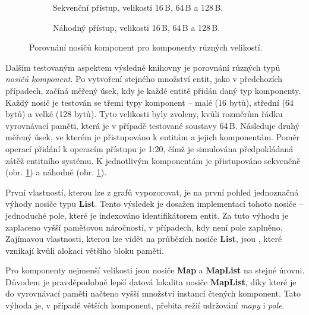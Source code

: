 \begin{figure}[H]
	\centering
	\begin{subfigure}[b]{\textwidth}
		\caption{Sekvenční přístup, velikosti 16\,B, 64\,B a 128\,B.}\label{Fig:EVALHoldersSeq}
	\end{subfigure}
	\begin{subfigure}[b]{\textwidth}
		\caption{Náhodný přístup, velikosti 16\,B, 64\,B a 128\,B.}\label{Fig:EVALHoldersRand}
	\end{subfigure}
	\caption{Porovnání nosičů komponent pro komponenty různých velikostí.}
\end{figure}

Dalším testovaným aspektem výsledné knihovny je porovnání různých typů \emph{nosičů komponent}. Po vytvoření stejného množství entit, jako v předchozích případech, začíná měřený úsek, kdy je každé entitě přidán daný typ komponenty. Každý nosič je testován se třemi typy komponent -- malé (16 bytů), střední (64 bytů) a velké (128 bytů). Tyto velikosti byly zvoleny, kvůli rozměrům řádku vyrovnávací paměti, která je v případě testované soustavy 64\,B. Následuje druhý měřený úsek, ve kterém je přistupováno k entitám a jejich komponentám. Poměr operací přidání k operacím přístupu je 1:20, čímž je simulována předpokládaná zátěž entitního systému. K jednotlivým komponentám je přistupováno sekvenčně (obr. \ref{Fig:EVALHoldersSeq}) a náhodně (obr. \ref{Fig:EVALHoldersSeq}).

První vlastností, kterou lze z grafů vypozorovat, je na první pohled jednoznačná výhody nosiče typu \textbf{List}. Tento výsledek je dosažen implementací tohoto nosiče -- jednoduché pole, které je indexováno identifikátorem entit. Za tuto výhodu je zaplaceno vyšší paměťovou náročností, v případech, kdy není pole zaplněno. Zajímavou vlastnosti, kterou lze vidět na průbězích nosiče \textbf{List}, jsou , které vznikají kvůli alokaci většího bloku paměti.

Pro komponenty nejmenší velikosti jsou nosiče \textbf{Map} a \textbf{MapList} na stejné úrovni. Důvodem je pravděpodobně lepší datová lokalita nosiče \textbf{MapList}, díky které je do vyrovnávací paměti načteno vyšší množství instancí čtených komponent. Tato výhoda je, v případě větších komponent, přebita režií udržování \emph{mapy} i \emph{pole}. 

